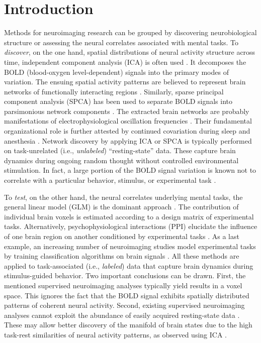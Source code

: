 \documentclass{article} %
\begin{document}
\section{Introduction}
%
Methods for neuroimaging research can be grouped by discovering
neurobiological structure or assessing the neural correlates associated
with mental tasks.
To \textit{discover}, on the one hand,
spatial distributions of neural activity
structure across time,
independent component analysis (ICA) is often used
\cite{beckmann2005}.
It decomposes the BOLD (blood-oxygen level-dependent) signals into the
primary modes of variation.
The ensuing spatial activity patterns are believed to represent
brain networks of
functionally interacting regions \cite{smith2009}.
Similarly, sparse principal component analysis (SPCA)
has been used to
separate BOLD signals into parsimonious network components
\cite{varoqu2011}.
The extracted brain networks are probably
manifestations of electrophysiological oscillation frequencies \cite{hipp15}.
Their fundamental organizational role is further
attested by continued covariation during sleep and anesthesia \cite{fox07}.
%
Network discovery by applying ICA or SPCA is typically performed on
task-unrelated (i.e., \textit{unlabeled}) ``resting-state'' data.
These capture brain dynamics
during ongoing random thought without controlled environmental stimulation.
In fact, a large portion of the BOLD signal variation
is known
not to correlate with a particular behavior, stimulus, or experimental task
\cite{fox07}. 

To \textit{test}, on the other hand,
the neural correlates underlying mental tasks,
the general linear model (GLM) is the dominant approach \cite{friston94}.
The contribution of
individual brain voxels is estimated
according to a design matrix of experimental tasks.
Alternatively, psychophysiological interactions (PPI)
elucidate the influence of one brain region on another conditioned
by experimental tasks \cite{friston97}.
As a last example, an increasing number of
neuroimaging studies model
experimental tasks by training classification algorithms on brain signals
\cite{poldrack09decoding}.
All these methods are applied to task-associated (i.e., \textit{labeled})
data that capture brain dynamics
during stimulus-guided behavior.
Two important conclusions can be drawn.
First, the mentioned supervised neuroimaging analyses typically yield
results in a voxel space.
This ignores the fact that the BOLD
signal exhibits spatially distributed patterns
of coherent neural activity.
%
Second, existing supervised neuroimaging analyses
cannot exploit the abundance
of easily acquired resting-state data \cite{biswaldiscovery}.
These may allow better discovery of
the manifold of brain states
due to the high task-rest similarities of neural activity patterns,
as observed using ICA \cite{smith2009}.
\end{document}
